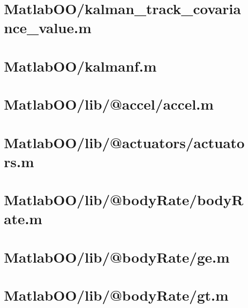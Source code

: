 \pagebreak
\section{MatlabOO/kalman\_track\_covariance\_value.m}\label{code:MatlabOO/kalman_track_covariance_value.m}


\pagebreak
\section{MatlabOO/kalmanf.m}\label{code:MatlabOO/kalmanf.m}


\pagebreak
\section{MatlabOO/lib/@accel/accel.m}\label{code:MatlabOO/lib/@accel/accel.m}


\pagebreak
\section{MatlabOO/lib/@actuators/actuators.m}\label{code:MatlabOO/lib/@actuators/actuators.m}


\pagebreak
\section{MatlabOO/lib/@bodyRate/bodyRate.m}\label{code:MatlabOO/lib/@bodyRate/bodyRate.m}


\pagebreak
\section{MatlabOO/lib/@bodyRate/ge.m}\label{code:MatlabOO/lib/@bodyRate/ge.m}


\pagebreak
\section{MatlabOO/lib/@bodyRate/gt.m}\label{code:MatlabOO/lib/@bodyRate/gt.m}


